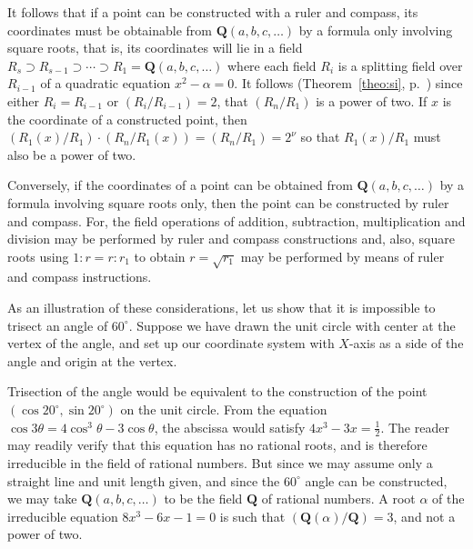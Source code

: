 \documentclass[10pt,leqno,a5paper]{book}
\theoremstyle{definition}
\def\QQ{\mathbf{Q}}
\begin{document}
It follows that if a point can be constructed with a ruler and compass, its coordinates must be obtainable from $\QQ(a,b,c,\ldots)$ by a formula only involving square roots, that is, its coordinates will lie in a field $R_s \supset R_{s-1} \supset \cdots \supset R_1 = \QQ(a,b,c,\ldots)$ where each field $R_i$ is a splitting field over $R_{i-1}$ of a quadratic equation $x^2 - \alpha = 0$.
It follows (Theorem~\ref{theo:si}, p.~\pageref{theo:si}) since either $R_i = R_{i-1}$ or $(R_i / R_{i-1}) = 2$, that $(R_n / R_1)$ is a power of two.
If $x$ is the coordinate of a constructed point, then $(R_1(x)/R_1) \cdot (R_n/R_1(x)) = (R_n/R_1) = 2^\nu$ so that $R_1(x)/R_1$ must also be a power of two.

Conversely, if the coordinates of a point can be obtained from $\QQ(a,b,c,\ldots)$ by a formula involving square roots only, then the point can be constructed by ruler and compass.
For, the field operations of addition, subtraction, multiplication and division may be performed by ruler and compass constructions and, also, square roots using $1:r = r:r_1$ to obtain $r = \sqrt{r_1}$ may be performed by means of ruler and compass instructions.

As an illustration of these considerations, let us show that it is impossible to trisect an angle of $60^\circ$.
Suppose we have drawn the unit circle with center at the vertex of the angle, and set up our coordinate system with $X$-axis as a side of the angle and origin at the vertex.

Trisection of the angle would be equivalent to the construction of the point $(\cos 20^\circ, \sin 20^\circ)$ on the unit circle.
From the equation $\cos 3\theta = 4 \cos^3 \theta - 3 \cos \theta$, the abscissa would satisfy $4x^3 - 3x = \frac12$.
The reader may readily verify that this equation has no rational roots, and is therefore irreducible in the field of rational numbers.
But since we may assume only a straight line and unit length given, and since the $60^\circ$ angle can be constructed, we may take $\QQ(a,b,c,\ldots)$ to be the field $\QQ$ of rational numbers.
A root $\alpha$ of the irreducible equation $8x^3 - 6x - 1 = 0$ is such that $(\QQ(\alpha) / \QQ) = 3$, and not a power of two.
\end{document}
